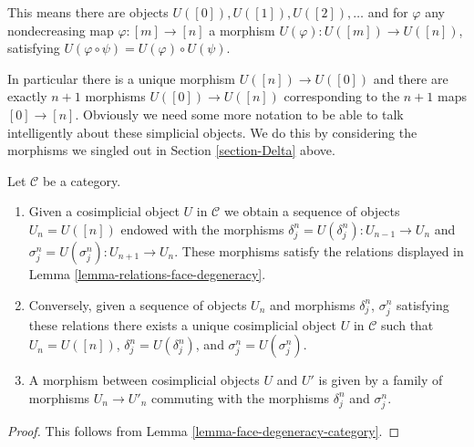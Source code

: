 \noindent
This means there are objects $U([0]), U([1]), U([2]), \ldots$
and for $\varphi$ any nondecreasing map $\varphi : [m] \to [n]$
a morphism $U(\varphi) : U([m]) \to U([n])$, satisfying
$U(\varphi \circ \psi) = U(\varphi) \circ U(\psi)$.

\medskip\noindent
In particular there is a unique morphism $U([n]) \to U([0])$ and there are
exactly $n + 1$ morphisms $U([0]) \to U([n])$ corresponding to
the $n + 1$ maps $[0] \to [n]$. Obviously we need some more notation
to be able to talk intelligently about these simplicial objects.
We do this by considering the morphisms we singled out in
Section \ref{section-Delta} above.

\begin{lemma}
\label{lemma-characterize-cosimplicial-object}
Let $\mathcal{C}$ be a category.
\begin{enumerate}
\item Given a cosimplicial object $U$ in $\mathcal{C}$
we obtain a sequence of objects $U_n = U([n])$ endowed
with the morphisms $\delta^n_j = U(\delta^n_j) : U_{n - 1} \to U_n$ and
$\sigma^n_j = U(\sigma^n_j) : U_{n + 1} \to U_n$. These morphisms
satisfy the relations displayed in
Lemma \ref{lemma-relations-face-degeneracy}.
\item Conversely, given a sequence of objects $U_n$ and morphisms
$\delta^n_j$, $\sigma^n_j$ satisfying these relations there exists a unique
cosimplicial object $U$ in $\mathcal{C}$ such that $U_n = U([n])$,
$\delta^n_j = U(\delta^n_j)$, and $\sigma^n_j = U(\sigma^n_j)$.
\item A morphism between cosimplicial objects $U$ and $U'$
is given by a family of morphisms $U_n \to U'_n$ commuting
with the morphisms $\delta^n_j$ and $\sigma^n_j$.
\end{enumerate}
\end{lemma}

\begin{proof}
This follows from Lemma \ref{lemma-face-degeneracy-category}.
\end{proof}


